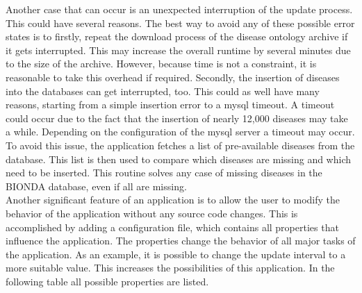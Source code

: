 Another case that can occur is an unexpected interruption of the update process. This could have several reasons. The best way to avoid any of these possible error states is to firstly, repeat the download process of the disease ontology archive if it gets interrupted. This may increase the overall runtime by several minutes due to the size of the archive. However, because time is not a constraint, it is reasonable to take this overhead if required. Secondly, the insertion of diseases into the databases can get interrupted, too. This could as well have many reasons, starting from a simple insertion error to a mysql timeout. A timeout could occur due to the fact that the insertion of nearly 12,000 diseases may take a while. Depending on the configuration of the mysql server a timeout may occur. To avoid this issue, the application fetches a list of pre-available diseases from the database. This list is then used to compare which diseases are missing and which need to be inserted. This routine solves any case of missing diseases in the \ac{BIONDA} database, even if all are missing.\\

Another significant feature of an application is to allow the user to modify the behavior of the application without any source code changes. This is accomplished by adding a configuration file, which contains all properties that influence the application. The properties change the behavior of all major tasks of the application. As an example, it is possible to change the update interval to a more suitable value. This increases the possibilities of this application. In the following table all possible properties are listed.

